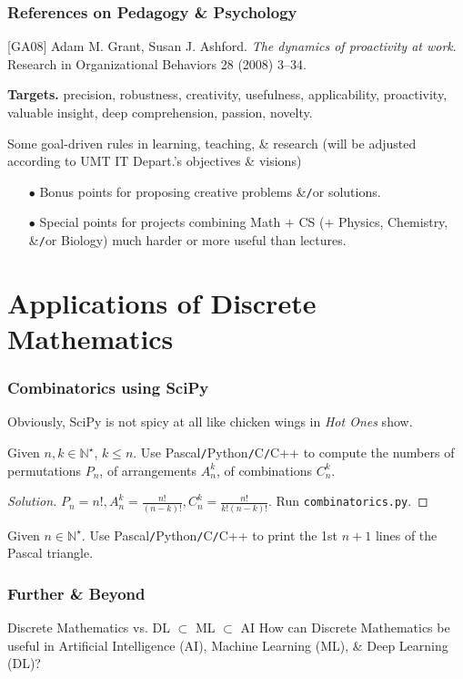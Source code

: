 \documentclass{beamer}
\begin{document}
\begin{frame}
	\frametitle{References on Pedagogy \& Psychology}
	[GA08] {\sc Adam M. Grant, Susan J. Ashford}. {\it The dynamics of proactivity at work}. Research in Organizational Behaviors 28 (2008) 3--34.
	\vspace{5mm}
	
	{\bf Targets.} precision, robustness, creativity, usefulness, applicability, proactivity, valuable insight, deep comprehension, passion, novelty.
	\begin{block}{Some goal-driven rules in learning, teaching, \& research}
		(will be adjusted according to UMT IT Depart.'s objectives \& visions)
		\begin{itemize}
			\item[$\bullet$] Bonus points for proposing creative problems \&{\tt/}or solutions.
			\item[$\bullet$] Special points for projects combining Math $+$ CS ($+$ Physics, Chemistry, \&{\tt/}or Biology) much harder or more useful than lectures.
		\end{itemize}
	\end{block}
\end{frame}

\section{Applications of Discrete Mathematics}

\begin{frame}
	\frametitle{Combinatorics using SciPy}
	Obviously, SciPy is not spicy at all like chicken wings in {\it Hot Ones} show.
	\begin{problem}
		Given $n,k\in\mathbb{N}^\star$, $k\le n$. Use {\sf Pascal{\tt/}Python{\tt/}C{\tt/}C++} to compute the numbers of permutations $P_n$, of arrangements $A_n^k$, of combinations $C_n^k$.
	\end{problem}
	
	\begin{proof}[Solution]
		$P_n = n!,A_n^k = \frac{n!}{(n - k)!},C_n^k = \frac{n!}{k!(n - k)!}$. Run {\tt combinatorics.py}.		
	\end{proof}
	
	\begin{problem}
		Given $n\in\mathbb{N}^\star$. Use {\sf Pascal{\tt/}Python{\tt/}C{\tt/}C++} to print the 1st $n + 1$ lines of the Pascal triangle.
	\end{problem}
\end{frame}

\begin{frame}
	\frametitle{Further \& Beyond}
	\begin{block}{Discrete Mathematics vs. DL $\subset$ ML $\subset$ AI}
		How can Discrete Mathematics be useful in Artificial Intelligence (AI), Machine Learning (ML), \& Deep Learning (DL)?
	\end{block}
	
\end{frame}
\end{document}
